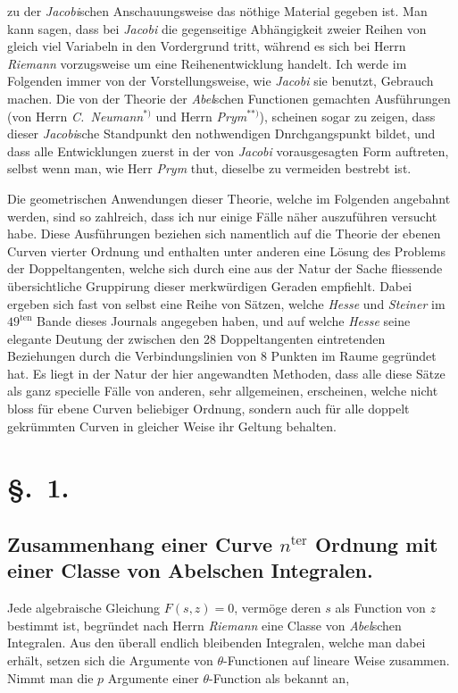 \documentclass{article}
\begin{document}
zu der \emph{Jacobi}schen Anschauungsweise das nöthige Material gegeben ist. Man kann sagen, dass bei \emph{Jacobi} die gegenseitige Abhängigkeit zweier Reihen von gleich viel Variabeln in den Vordergrund tritt, während es sich bei Herrn \emph{Riemann} vorzugsweise um eine Reihenentwicklung handelt. Ich werde im Folgenden immer von der Vorstellungsweise, wie \emph{Jacobi} sie benutzt, Gebrauch machen. Die von der Theorie der \emph{Abel}schen Functionen gemachten Ausführungen (von Herrn \emph{C.\ Neumann}${}^{*)}$ und Herrn \emph{Prym}${}^{**)}$), scheinen sogar zu zeigen, dass dieser \emph{Jacobi}sche Standpunkt den nothwendigen Dnrchgangspunkt bildet, und dass alle Entwicklungen zuerst in der von \emph{Jacobi} vorausgesagten Form auftreten, selbst wenn man, wie Herr \emph{Prym} thut, dieselbe zu vermeiden bestrebt ist.

Die geometrischen Anwendungen dieser Theorie, welche im Folgenden angebahnt werden, sind so zahlreich, dass ich nur einige Fälle näher auszuführen versucht habe. Diese Ausführungen beziehen sich namentlich auf die Theorie der ebenen Curven vierter Ordnung und enthalten unter anderen eine Lösung des Problems der Doppeltangenten, welche sich durch eine aus der Natur der Sache fliessende übersichtliche Gruppirung dieser merkwürdigen Geraden empfiehlt. Dabei ergeben sich fast von selbst eine Reihe von Sätzen, welche \emph{Hesse} und \emph{Steiner} im $49^{\text{ten}}$ Bande dieses Journals angegeben haben, und auf welche \emph{Hesse} seine elegante Deutung der zwischen den 28 Doppeltangenten eintretenden Beziehungen durch die Verbindungslinien von 8 Punkten im Raume gegründet hat. Es liegt in der Natur der hier angewandten Methoden, dass alle diese Sätze als ganz specielle Fälle von anderen, sehr allgemeinen, erscheinen, welche nicht bloss für ebene Curven beliebiger Ordnung, sondern auch für alle doppelt gekrümmten Curven in gleicher Weise ihr Geltung behalten.

\section*{§.~1.}
\subsection*{Zusammenhang einer Curve $n^{\text{ter}}$ Ordnung mit einer Classe von Abelschen Integralen.}

Jede algebraische Gleichung $F(s, z) = 0$, vermöge deren $s$ als Function von $z$ bestimmt ist, begründet nach Herrn \emph{Riemann} eine Classe von \emph{Abel}schen Integralen. Aus den überall endlich bleibenden Integralen, welche man dabei erhält, setzen sich die Argumente von $\theta$-Functionen auf lineare Weise zusammen. Nimmt man die $p$ Argumente einer $\theta$-Function als bekannt an,
\end{document}
